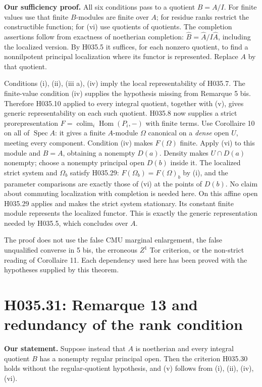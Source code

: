 \textbf{Our sufficiency proof.} All six conditions pass to a quotient
$B=A/I$. For finite values use that finite $B$-modules are finite over
$A$; for residue ranks restrict the constructible function; for (vi)
use quotients of quotients. The completion assertions follow from
exactness of noetherian completion:
$\widehat B=\widehat A/I\widehat A$, including the localized version.
By H035.5 it suffices, for each nonzero quotient, to find a
nonnilpotent principal localization where its functor is represented.
Replace $A$ by that quotient.

Conditions (i), (ii), (iii a), (iv) imply the local representability
of H035.7. The finite-value condition (iv) supplies the hypothesis
missing from Remarque 5 bis. Therefore H035.10 applied to every
integral quotient, together with (v), gives generic representability
on each such quotient. H035.8 now supplies a strict prorepresentation
$F=\operatorname{colim}_i\operatorname{Hom}(P_i,-)$ with finite terms.
Use Corollaire 10 on all of $\operatorname{Spec}A$: it gives a finite
$A$-module $\Omega$ canonical on a \emph{dense} open $U$, meeting
every component. Condition (iv) makes $F(\Omega)$ finite. Apply (vi)
to this module and $B=A$, obtaining a nonempty $D(a)$. Density makes
$U\cap D(a)$ nonempty; choose a nonempty principal open $D(b)$
inside it. The localized strict system and $\Omega_b$ satisfy
H035.29: $F(\Omega_b)=F(\Omega)_b$ by (i), and the parameter
comparisons are exactly those of (vi) at the points of $D(b)$.
No claim about commuting localization with completion is needed here.
On this affine open H035.29 applies and makes the strict system
stationary. Its constant finite module represents the localized
functor. This is exactly the generic representation needed by H035.5,
which concludes over $A$.

The proof does not use the false CMU marginal enlargement, the false
unqualified converse in 5 bis, the erroneous $Z^1$ Tor criterion, or
the non-strict reading of Corollaire 11. Each dependency used here has
been proved with the hypotheses supplied by this theorem.

\section{H035.31: Remarque 13 and redundancy of the rank condition}
\textbf{Our statement.} Suppose instead that $A$ is noetherian and
every integral quotient $B$ has a nonempty regular principal open.
Then the criterion H035.30 holds without the regular-quotient
hypothesis, and (v) follows from (i), (ii), (iv), (vi).

